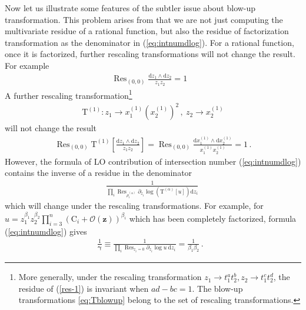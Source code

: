 \documentclass[a4paper,11pt]{article}
\newcommand{\nd}{\mathrm{d}}
\newcommand{\nT}{\mathrm{T}}
\def\eref#1{(\ref{#1})}
\DeclareMathOperator{\Res}{Res}
\begin{document}
Now let us illustrate some features of the subtler issue about blow-up transformation.
This problem arises from that we are not just computing the multivariate residue of a rational function, but also 
the residue of factorization transformation as the denominator in \eref{eq:intnumdlog}.
For a rational function, once it is factorized, further rescaling transformations will not change the result. For example
\begin{align}
\Res_{(0,0)}\frac{\nd z_1\wedge \nd z_2}{z_1 z_2} =1~~~~\label{res-1}
\end{align}
A further rescaling transformation\footnote{More generally, under the rescaling transformation 
$z_1\to t_1^a t_2^b,z_2\to t_1^c t_2^d$, the residue of \eref{res-1} is invariant when $ad-bc=1$. The blow-up transformations \eqref{eq:Tblowup} belong to the set of rescaling transformations.}
\begin{align}
\nT^{(1)}: z_1\to x^{(1)}_1 \left(x^{(1)}_2\right)^2\,, \ z_2\to x^{(1)}_2
\end{align}
will not change the result
\begin{align}
\Res_{(0,0)}\nT^{(1)}\left[\frac{\nd z_1\wedge \nd z_2}{z_1 z_2}\right] =\Res_{(0,0)}\frac{\nd x^{(1)}_1\wedge \nd x^{(1)}_2}{x^{(1)}_1 x^{(1)}_2} = 1 \, .
\end{align}
However,  the formula of LO contribution of intersection number \eref{eq:intnumdlog} contains the 
inverse of a residue in the denominator
\begin{align}
	\frac{1}{ \prod_{i} \Res_{\rho^{(\alpha)}_i} \partial_{z_i} \log\left(\nT^{(\alpha)}\left[u \right] \right) \nd z_i} \,
\end{align}
which will change under the rescaling transformations. 
For example, for  $u=z_1^{\beta_1}z_2^{\beta_2}\prod_{i=3}^n (\text{C}_i+\mathcal{O}(\bm{z}))^{\beta_i}$
which has been completely factorized, formula \eref{eq:intnumdlog} gives 
\begin{align}
\frac{1}{\bm{\gamma}} \equiv \frac{1}{ \prod_{i} \Res_{z_i=0} \partial_{z_i} \log u ~ \nd z_i} =\frac{1}{\beta_1 \beta_2}  \, .~~~\label{rescale-1-1}
\end{align}
\end{document}

